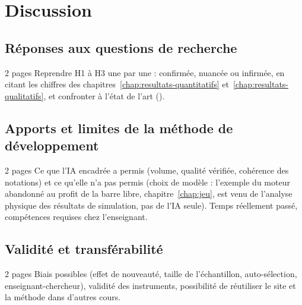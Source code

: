 
\chapter{Discussion}
\label{chap:discussion}

\section{Réponses aux questions de recherche}

\begin{arediger}{2 pages}
Reprendre H1 à H3 une par une : confirmée, nuancée ou infirmée, en citant les
chiffres des chapitres~\ref{chap:resultats-quantitatifs}
et~\ref{chap:resultats-qualitatifs}, et confronter à l'état de l'art
(\cite{dejong1998, mayer2009, adams2008phet}).
\end{arediger}

\section{Apports et limites de la méthode de développement}

\begin{arediger}{2 pages}
Ce que l'IA encadrée a permis (volume, qualité vérifiée, cohérence des
notations) et ce qu'elle n'a pas permis (choix de modèle : l'exemple du moteur
abandonné au profit de la barre libre, chapitre~\ref{chap:jeu}, est venu de
l'analyse physique des résultats de simulation, pas de l'IA seule). Temps
réellement passé, compétences requises chez l'enseignant.
\end{arediger}

\section{Validité et transférabilité}

\begin{arediger}{2 pages}
Biais possibles (effet de nouveauté, taille de l'échantillon, auto-sélection,
enseignant-chercheur), validité des instruments, possibilité de réutiliser le
site et la méthode dans d'autres cours.
\end{arediger}
